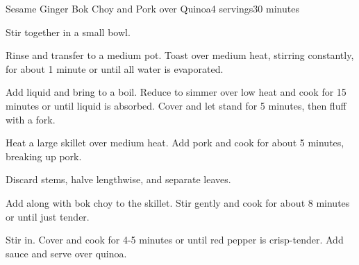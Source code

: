 \documentclass[../Cookbook.tex]{subfiles}
\begin{document}
\begin{recipe}{Sesame Ginger Bok Choy and Pork over Quinoa}{4 servings}{30 minutes}

Stir together in a small bowl.

Rinse and transfer to a medium pot. Toast over medium heat, stirring constantly, for about 1 minute or until all water is evaporated.

Add liquid and bring to a boil. Reduce to simmer over low heat and cook for 15 minutes or until liquid is absorbed. Cover and let stand for 5 minutes, then fluff with a fork.

Heat a large skillet over medium heat. Add pork and cook for about 5 minutes, breaking up pork.

Discard stems, halve lengthwise, and separate leaves.

Add along with bok choy to the skillet. Stir gently and cook for about 8 minutes or until just tender.

Stir in. Cover and cook for 4-5 minutes or until red pepper is crisp-tender. Add sauce and serve over quinoa.

\end{recipe}
\end{document}

